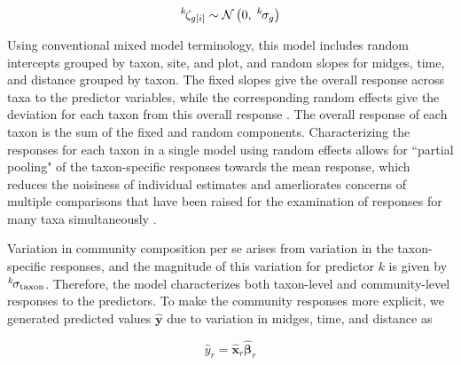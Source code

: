 \begin{equation} \label{eq:zetas}
    {}^k\hspace*{-1pt}\zeta_{g[i]} \sim
        \mathcal{N}\left(0, \; {}^k\hspace*{-1pt}\sigma_g \right)
\end{equation}

Using conventional mixed model terminology, this model includes random intercepts
grouped by taxon, site, and plot, and random slopes for midges,
time, and distance grouped by taxon.
The fixed slopes give the overall response across taxa to the predictor variables,
while the corresponding random effects give the deviation for each taxon from
this overall response \citep{Jackson2012}.
The overall response of each taxon is the sum of the fixed and random components.
Characterizing the responses for each taxon in a single model using random effects
allows for ``partial pooling" of the taxon-specific responses towards the mean response,
which reduces the noisiness of individual estimates and amerliorates concerns of
multiple comparisons \citep{Gelman2012} that have been raised
for the examination of responses for many taxa simultaneously \citep{Mcgarigal2013}.

Variation in community composition per se arises from variation in the taxon-specific
responses, and the magnitude of this
variation for predictor $k$ is given by ${}^k\hspace*{-1pt}\sigma_\text{taxon}$.
Therefore, the model characterizes both
taxon-level and community-level responses to the predictors.
To make the community responses more explicit, we generated predicted values
$\hat{\mathbf{y}}$ due to variation in midges, time, and distance as

\begin{equation} \label{eq:preds}
    \hat{y}_r = \hat{\mathbf{x}}_r \hat{{\boldsymbol\beta}}_r
\end{equation}

